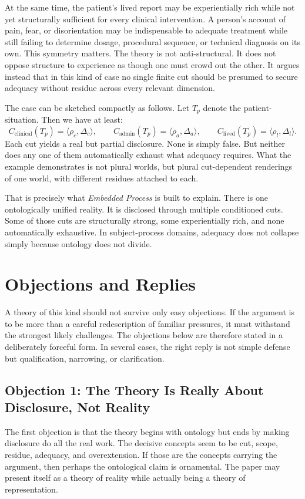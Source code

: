 \documentclass[11pt]{article}
\renewcommand{\emph}[1]{\textit{#1}}
\begin{document}
At the same time, the patient's lived report may be experientially rich while not yet structurally sufficient for every clinical intervention. A person's account of pain, fear, or disorientation may be indispensable to adequate treatment while still failing to determine dosage, procedural sequence, or technical diagnosis on its own. This symmetry matters. The theory is not anti-structural. It does not oppose structure to experience as though one must crowd out the other. It argues instead that in this kind of case no single finite cut should be presumed to secure adequacy without residue across every relevant dimension.

The case can be sketched compactly as follows. Let \(T_p\) denote the patient-situation. Then we have at least:
\[
C_{\text{clinical}}(T_p)=\langle \rho_c,\Delta_c\rangle,\qquad
C_{\text{admin}}(T_p)=\langle \rho_a,\Delta_a\rangle,\qquad
C_{\text{lived}}(T_p)=\langle \rho_l,\Delta_l\rangle.
\]
Each cut yields a real but partial disclosure. None is simply false. But neither does any one of them automatically exhaust what adequacy requires. What the example demonstrates is not plural worlds, but plural cut-dependent renderings of one world, with different residues attached to each.

That is precisely what \emph{Embedded Process} is built to explain. There is one ontologically unified reality. It is disclosed through multiple conditioned cuts. Some of those cuts are structurally strong, some experientially rich, and none automatically exhaustive. In subject-process domains, adequacy does not collapse simply because ontology does not divide.
\section{Objections and Replies}

A theory of this kind should not survive only easy objections. If the argument is to be more than a careful redescription of familiar pressures, it must withstand the strongest likely challenges. The objections below are therefore stated in a deliberately forceful form. In several cases, the right reply is not simple defense but qualification, narrowing, or clarification.

\subsection{Objection 1: The Theory Is Really About Disclosure, Not Reality}

The first objection is that the theory begins with ontology but ends by making disclosure do all the real work. The decisive concepts seem to be cut, scope, residue, adequacy, and overextension. If those are the concepts carrying the argument, then perhaps the ontological claim is ornamental. The paper may present itself as a theory of reality while actually being a theory of representation.
\end{document}
